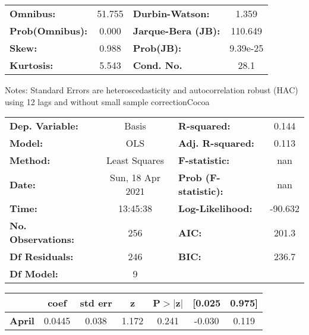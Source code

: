 \begin{center}
\begin{tabular}{lcccccc}
\bottomrule
\end{tabular}
\begin{tabular}{lclc}
\textbf{Omnibus:}       & 51.755 & \textbf{  Durbin-Watson:     } &    1.359  \\
\textbf{Prob(Omnibus):} &  0.000 & \textbf{  Jarque-Bera (JB):  } &  110.649  \\
\textbf{Skew:}          &  0.988 & \textbf{  Prob(JB):          } & 9.39e-25  \\
\textbf{Kurtosis:}      &  5.543 & \textbf{  Cond. No.          } &     28.1  \\
\bottomrule
\end{tabular}
\end{center}

Notes: \newline
 [1] Standard Errors are heteroscedasticity and autocorrelation robust (HAC) using 12 lags and without small sample correctionCocoa\begin{center}
\begin{tabular}{lclc}
\toprule
\textbf{Dep. Variable:}    &      Basis       & \textbf{  R-squared:         } &     0.144   \\
\textbf{Model:}            &       OLS        & \textbf{  Adj. R-squared:    } &     0.113   \\
\textbf{Method:}           &  Least Squares   & \textbf{  F-statistic:       } &       nan   \\
\textbf{Date:}             & Sun, 18 Apr 2021 & \textbf{  Prob (F-statistic):} &      nan    \\
\textbf{Time:}             &     13:45:38     & \textbf{  Log-Likelihood:    } &   -90.632   \\
\textbf{No. Observations:} &         256      & \textbf{  AIC:               } &     201.3   \\
\textbf{Df Residuals:}     &         246      & \textbf{  BIC:               } &     236.7   \\
\textbf{Df Model:}         &           9      & \textbf{                     } &             \\
\bottomrule
\end{tabular}
\begin{tabular}{lcccccc}
                   & \textbf{coef} & \textbf{std err} & \textbf{z} & \textbf{P$> |$z$|$} & \textbf{[0.025} & \textbf{0.975]}  \\
\midrule
\textbf{April}     &       0.0445  &        0.038     &     1.172  &         0.241        &       -0.030    &        0.119     \\

\end{tabular}
\end{center}
